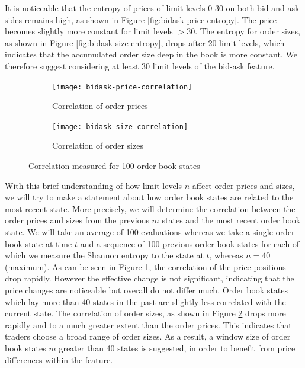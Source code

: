 It is noticeable that the entropy of prices of limit levels 0-30 on both bid and ask sides remains high, as shown in Figure \ref{fig:bidask-price-entropy}. 
The price becomes slightly more constant for limit levels $>30$. 
The entropy for order sizes, as shown in Figure \ref{fig:bidask-size-entropy}, drops after 20 limit levels, which indicates that the accumulated order size deep in the book is more constant. 
We therefore suggest considering at least 30 limit levels of the bid-ask feature.

\begin{figure}[H]
    \centering
    \begin{subfigure}[b]{0.45\textwidth}
        \texttt{[image: bidask-price-correlation]}
        \caption{Correlation of order prices}
        \label{fig:bidask-price-correlation}
    \end{subfigure}
    \begin{subfigure}[b]{0.45\textwidth}
        \texttt{[image: bidask-size-correlation]}
        \caption{Correlation of order sizes}
        \label{fig:bidask-size-correlation}
    \end{subfigure}
    \caption{Correlation measured for 100 order book states}\label{fig:bidask-correlation}
\end{figure}

With this brief understanding of how limit levels $n$ affect order prices and sizes, we will try to make a statement about how order book states are related to the most recent state.
More precisely, we will determine the correlation between the order prices and sizes from the previous $m$ states and the most recent order book state.
We will take an average of 100 evaluations whereas we take a single order book state at time $t$ and a sequence of 100 previous order book states for each of which we measure the Shannon entropy\cite{shannon2001mathematical} to the state at $t$, whereas $n=40$ (maximum).
As can be seen in Figure \ref{fig:bidask-price-correlation}, the correlation of the price positions drop rapidly. However the effective change is not significant, indicating that the price changes are noticeable but overall do not differ much.
Order book states which lay more than 40 states in the past are slightly less correlated with the current state.
The correlation of order sizes, as shown in Figure \ref{fig:bidask-size-correlation} drops more rapidly and to a much greater extent than the order prices.
This indicates that traders choose a broad range of order sizes.
As a result, a window size of order book states $m$ greater than 40 states is suggested, in order to benefit from price differences within the feature.


